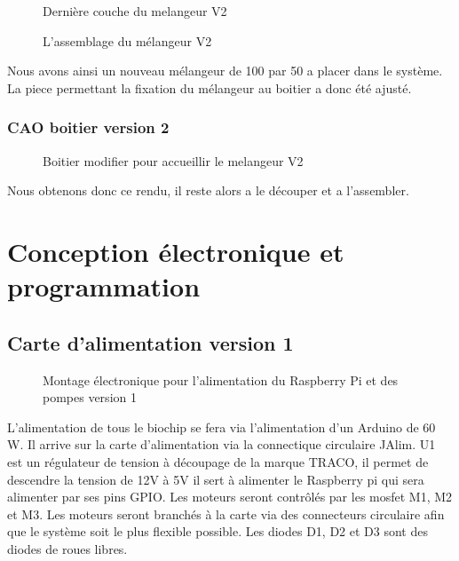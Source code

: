 \documentclass[a4paper, 11pt]{article}
\begin{document}
\begin{multicols}{2}
    \begin{figure}[H]
        \centering
        \caption{Dernière couche du melangeur V2}
        \label{fig: CAO_melangeur_V2_couche3}
    \end{figure}
    \begin{figure}[H]
        \centering
        \caption{L'assemblage du mélangeur V2}
        \label{fig:CAO_melangeur_V2}
    \end{figure}
\end{multicols}
Nous avons ainsi un nouveau mélangeur de 100 par 50 a placer dans le système. La piece permettant la fixation du mélangeur
au boitier a donc été ajusté.
\subsubsection{CAO boitier version 2}
\begin{figure}[H]
    \centering
    \caption{Boitier modifier pour accueillir le melangeur V2}
    \label{fig:CAO_boitier_V2}
\end{figure}
Nous obtenons donc ce rendu, il reste alors a le découper et a l'assembler.
\newpage
\section{Conception électronique et programmation}
\subsection{Carte d'alimentation version 1}
\begin{figure}[H]
    \centering
    \caption{Montage électronique pour l'alimentation du Raspberry Pi et des pompes version 1}
    \label{fig:CAO_electronique_V1}
\end{figure}
L'alimentation de tous le biochip se fera via l'alimentation d'un Arduino de 60 W.
Il arrive sur la carte d'alimentation via la connectique circulaire JAlim.
U1 est un régulateur de tension à découpage de la marque TRACO, il permet de descendre la tension de 12V à 5V il sert à alimenter le Raspberry pi qui sera alimenter par ses pins GPIO.
Les moteurs seront contrôlés par les mosfet M1, M2 et M3.
Les moteurs seront branchés à la carte via des connecteurs circulaire afin que le système soit le plus flexible possible.
Les diodes D1, D2 et D3 sont des diodes de roues libres.
\end{document}
